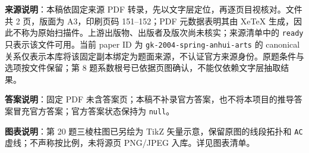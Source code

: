 


\begin{gktip}
\textbf{来源说明}：本稿依固定来源 PDF 转录，先以文字层定位，再逐页目视核对。文件共 2 页，版面为 A3，印刷页码 151–152；PDF 元数据表明其由 XeTeX 生成，因此不称为原始扫描件。上游出版物、出版者及版次尚未核实；来源清单中的 \texttt{ready} 只表示该文件可用。当前 paper ID 为 \texttt{gk-2004-spring-anhui-arts} 的 canonical 关系仅表示本库将该固定副本绑定为题面来源，不认证官方来源身份。原题条件与选项按文件保留；第 8 题系数根号已依据页图确认，不能仅依赖文字层抽取结果。

\textbf{答案说明}：固定 PDF 未含答案页；本稿不补录官方答案，也不将本项目的推导答案冒充官方答案；官方答案状态保持为 \texttt{null}。

\textbf{图表说明}：第 20 题三棱柱图已另绘为 TikZ 矢量示意，保留原图的线段拓扑和 \texttt{AC} 虚线；不声称按比例，未将源页 PNG/JPEG 入库。详见图表清单。
\end{gktip}


